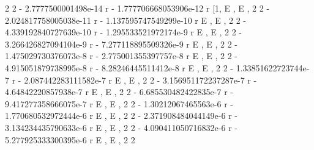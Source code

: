 \documentclass[a4paper,10pt]{article}
\begin{document}
\begin{eulernotebook}
\begin{eulercomment}
\begin{eulercomment}
\begin{eulercomment}
\begin{eulercomment}
\begin{eulercomment}
\begin{eulercomment}
\begin{eulercomment}
\begin{eulercomment}
\begin{eulercomment}
\begin{eulercomment}
\begin{eulercomment}
\begin{eulercomment}
\begin{eulercomment}
\begin{eulercomment}
\begin{eulercomment}
\begin{eulercomment}
\begin{eulercomment}
\begin{eulercomment}
\begin{eulercomment}
\begin{eulercomment}
\begin{eulercomment}
\begin{eulercomment}
\begin{eulercomment}
\begin{eulercomment}
\begin{eulercomment}
\begin{eulercomment}
\begin{eulercomment}
\begin{eulercomment}
\begin{euleroutput}
                                      2                            2
               - 2.7777500001498e-14 r    - 1.777706668053906e-12 r
          [1, E                        , E                          , 
                            2                            2
   - 2.024817758005038e-11 r    - 1.137595747549299e-10 r
  E                          , E                          , 
                            2                           2
   - 4.339192840727639e-10 r    - 1.295533521972174e-9 r
  E                          , E                         , 
                           2                           2
   - 3.266426827094104e-9 r    - 7.277118895509326e-9 r
  E                         , E                         , 
                           2                           2
   - 1.475029730376073e-8 r    - 2.775001355397757e-8 r
  E                         , E                         , 
                           2                          2
   - 4.915051879738995e-8 r    - 8.28246445511412e-8 r
  E                         , E                        , 
                          2                           2
   - 1.33851622723744e-7 r    - 2.087442283111582e-7 r
  E                        , E                         , 
                           2                          2
   - 3.156951172237287e-7 r    - 4.64842220857938e-7 r
  E                         , E                        , 
                           2                           2
   - 6.685530482422835e-7 r    - 9.417277358666075e-7 r
  E                         , E                         , 
                          2                           2
   - 1.30212067465563e-6 r    - 1.770680532972444e-6 r
  E                        , E                         , 
                           2                           2
   - 2.371908484044149e-6 r    - 3.134234435790633e-6 r
  E                         , E                         , 
                           2                           2
   - 4.090411050716832e-6 r    - 5.277925333300395e-6 r
  E                         , E                         , 
                           2                           2

\end{euleroutput}
\end{eulercomment}
\end{eulercomment}
\end{eulercomment}
\end{eulercomment}
\end{eulercomment}
\end{eulercomment}
\end{eulercomment}
\end{eulercomment}
\end{eulercomment}
\end{eulercomment}
\end{eulercomment}
\end{eulercomment}
\end{eulercomment}
\end{eulercomment}
\end{eulercomment}
\end{eulercomment}
\end{eulercomment}
\end{eulercomment}
\end{eulercomment}
\end{eulercomment}
\end{eulercomment}
\end{eulercomment}
\end{eulercomment}
\end{eulercomment}
\end{eulercomment}
\end{eulercomment}
\end{eulercomment}
\end{eulercomment}
\end{eulernotebook}
\end{document}
